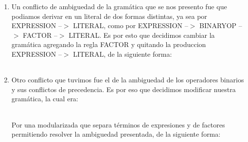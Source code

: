 \begin{enumerate}
\begin{reglas}
\end{reglas}

\item Un conflicto de ambiguedad de la gramática que se nos presento fue que
  podiamos derivar en un literal de dos formas distintas, ya sea por EXPRESSION
  --$>$ LITERAL, como por EXPRESSION --$>$ BINARYOP --$>$ FACTOR --$>$ LITERAL. Es por esto que decidimos cambiar la
  gramática agregando la regla FACTOR y quitando la produccion EXPRESSION --$>$
  LITERAL, de la siguiente forma:
  \\
  \\
  \begin{reglas} 
  \end{reglas}

\item Otro conflicto que tuvimos fue el de la ambiguedad de los operadores
  binarios y sus conflictos de precedencia. Es por eso que decidimos modificar
  nuestra gramática, la cual era:

  \begin{reglas}
  \end{reglas}
    \\
    Por una modularizada que separa términos de expresiones y de factores
    permitiendo resolver la ambiguedad presentada, de la siguiente forma:
    \\
  \begin{reglas}
    \\
    \\ 
  \end{reglas}
\end{enumerate}




